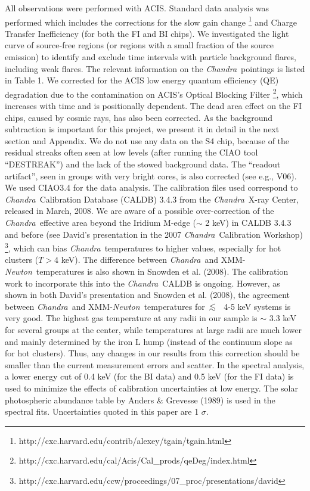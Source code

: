\documentclass{aastex}
\newcommand{\lsim}{\mbox{\hspace{.2em}\raisebox{.5ex}{$<$}\hspace{-.8em}\raisebox{-.5ex}{$\sim$}
\hspace{.2em}}}
\def\chandra    {{\em Chandra}\/}
\def\xmm        {XMM-{\em Newton}\/}
\begin{document}
All observations were performed with ACIS.
Standard data analysis was performed which includes
the corrections for the slow gain change
\footnote{http://cxc.harvard.edu/contrib/alexey/tgain/tgain.html}
and Charge Transfer Inefficiency (for both the FI and BI chips). 
We investigated the light curve of source-free regions (or regions with a small
fraction of the source emission) to identify and exclude time intervals with particle
background flares, including weak flares.
The relevant information on the \chandra\ pointings is listed in Table 1.
We corrected for the ACIS low energy quantum efficiency (QE) degradation
due to the contamination on ACIS's Optical Blocking Filter
\footnote{http://cxc.harvard.edu/cal/Acis/Cal\_prods/qeDeg/index.html},
which increases with time and is positionally dependent.
The dead area effect on the FI chips, caused by cosmic rays, has also been
corrected. As the background subtraction is important for this project,
we present it in detail in the next section and Appendix.
We do not use any data on the S4 chip, because of the residual streaks
often seen at low levels (after running the CIAO tool ``DESTREAK'') and the
lack of the stowed background data.
The ``readout artifact'', seen in groups with very bright cores, is
also corrected (see e.g., V06). We used CIAO3.4 for the data analysis.
The calibration files used correspond to \chandra\ Calibration Database
(CALDB) 3.4.3 from the \chandra\ X-ray Center, released in March, 2008.
We are aware of a possible over-correction of the \chandra\ effective area
beyond the Iridium M-edge ($\sim$ 2 keV) in CALDB 3.4.3 and before
(see David's presentation in the 2007 \chandra\ Calibration Workshop)
\footnote{http://cxc.harvard.edu/ccw/proceedings/07\_proc/presentations/david},
which can bias \chandra\ temperatures to higher values, especially for hot
clusters ($T > 4$ keV). The difference between \chandra\ and \xmm\ temperatures
is also shown in Snowden et al. (2008). The calibration work to incorporate
this into the \chandra\ CALDB is ongoing. However, as shown in both
David's presentation and Snowden et al. (2008), the agreement between \chandra\ and
\xmm\ temperatures for $\lsim$ 4-5 keV systems is very good. The highest gas
temperature at any radii in our sample is $\sim$ 3.3 keV for several groups at the center,
while temperatures at large radii are much lower and mainly determined by
the iron L hump (instead of the continuum slope as for hot clusters). Thus, any
changes in our results from this correction should be smaller than the current
measurement errors and scatter.
In the spectral analysis, a lower energy cut of 0.4 keV (for the BI data)
and 0.5 keV (for the FI data) is used to
minimize the effects of calibration uncertainties at low energy.
The solar photospheric abundance table by Anders \& Grevesse
(1989) is used in the spectral fits. Uncertainties quoted in this paper are 1 $\sigma$.
\end{document}
